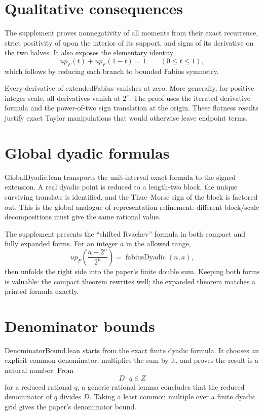 \documentclass[11pt,a4paper,openany]{book}
\def\module#1{#1.lean}
\def\decl#1{#1}
\def\upfun{up}
\def\Z{Z}
\newcommand{\Z}{\ensuremath{\mathbb{Z}}}
\newcommand{\upfun}{\ensuremath{\operatorname{up}}}
\newcommand{\module}[1]{\nolinkurl{#1.lean}}
\newcommand{\decl}[1]{\texttt{\detokenize{#1}}}
\begin{document}
\section{Qualitative consequences}
The supplement proves nonnegativity of all moments from their exact recurrence,
strict positivity of \upfun on the interior of its support, and signs of its
derivative on the two halves.  It also exposes the elementary identity
\[
 \upfun_F(t)+\upfun_F(1-t)=1\qquad(0\le t\le1),
\]
which follows by reducing each branch to bounded Fabius symmetry.

Every derivative of \decl{extendedFabius} vanishes at zero.  More generally,
for positive integer scale, all derivatives vanish at $2^s$.  The proof uses
the iterated derivative formula and the power-of-two sign translation at the
origin.  These flatness results justify exact Taylor manipulations that would
otherwise leave endpoint terms.

\section{Global dyadic formulas}
\module{GlobalDyadic} transports the unit-interval exact formula to the signed
extension.  A real dyadic point is reduced to a length-two block, the unique
surviving translate is identified, and the Thue--Morse sign of the block is
factored out.  This is the global analogue of representation refinement:
different block/scale decompositions must give the same rational value.

The supplement presents the “shifted Rvachev” formula in both compact and fully
expanded forms.  For an integer $a$ in the allowed range,
\[
 \upfun_F\!\left(\frac{a-2^n}{2^n}\right)
   =\operatorname{fabiusDyadic}(n,a),
\]
then unfolds the right side into the paper's finite double sum.  Keeping both
forms is valuable: the compact theorem rewrites well; the expanded theorem
matches a printed formula exactly.

\section{Denominator bounds}
\module{DenominatorBound} starts from the exact finite dyadic formula.  It
chooses an explicit common denominator, multiplies the sum by it, and proves
the result is a natural number.  From
\[
 D\cdot q\in\Z
\]
for a reduced rational $q$, a generic rational lemma concludes that the
reduced denominator of $q$ divides $D$.  Taking a least common multiple over a
finite dyadic grid gives the paper's denominator bound.
\end{document}
